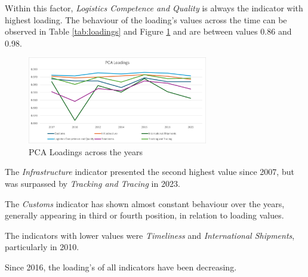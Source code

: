 \documentclass[conference]{IEEEtran}
\begin{document}
Within this factor,  \textit{Logistics Competence and Quality} is always the indicator with highest loading. The behaviour of the loading's values across the time can be observed in Table \ref{tab:loadings} and Figure \ref{fig:PCAl} and are between values 0.86 and 0.98.

\begin{figure}
    \centering
    \includegraphics[width=0.7\textwidth]{Loadings.png}
    \caption{PCA Loadings across the years}
    \label{fig:PCAl}
\end{figure}

The \textit{Infrastructure} indicator presented the second highest value since 2007, but was surpassed by \textit{Tracking and Tracing} in 2023.

The \textit{Customs} indicator has shown almost constant behaviour over the years, generally appearing in third or fourth position, in relation to loading values.

The indicators with lower values were \textit{Timeliness} and \textit{International Shipments}, particularly in 2010.

Since 2016, the loading's of all indicators have been decreasing.

%
\end{document}
